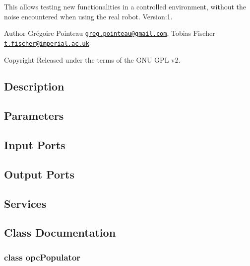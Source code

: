 This allows testing new functionalities in a controlled environment, without the noise encountered when using the real robot. Version\+:1. \begin{DoxyAuthor}{Author}
Grégoire Pointeau \href{mailto:greg.pointeau@gmail.com}{\tt greg.\+pointeau@gmail.\+com}, Tobias Fischer \href{mailto:t.fischer@imperial.ac.uk}{\tt t.\+fischer@imperial.\+ac.\+uk} ~\newline

\end{DoxyAuthor}
\begin{DoxyCopyright}{Copyright}
Released under the terms of the G\+NU G\+PL v2. 
\end{DoxyCopyright}
\hypertarget{group__touchDetector_intro_sec}{}\subsection{Description}\label{group__touchDetector_intro_sec}
\hypertarget{group__touchDetector_parameters_sec}{}\subsection{Parameters}\label{group__touchDetector_parameters_sec}
\hypertarget{group__touchDetector_inputports_sec}{}\subsection{Input Ports}\label{group__touchDetector_inputports_sec}
\hypertarget{group__touchDetector_outputports_sec}{}\subsection{Output Ports}\label{group__touchDetector_outputports_sec}
\hypertarget{group__touchDetector_services_sec}{}\subsection{Services}\label{group__touchDetector_services_sec}


\subsection{Class Documentation}
\label{classopcPopulator}
\subsubsection{class opc\+Populator}


